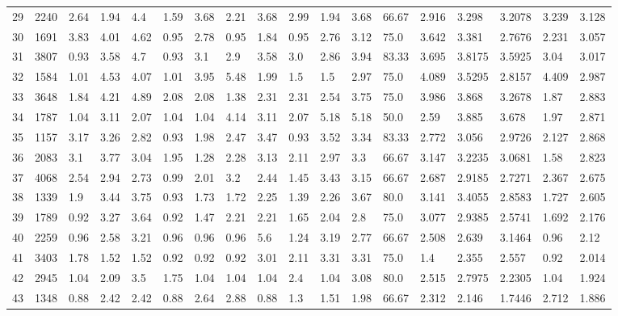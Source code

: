 \documentclass[landscape, 10pt]{report}
\begin{document}
\begin{longtable}{l || l || l | l | l | l | l | l | l | l | l | l | l || l | l | l | l | l}
\rowcolor{lightgray}29 & 2240 & 2.64 & 1.94 & 4.4 & 1.59 & 3.68 & 2.21 & 3.68 & 2.99 & 1.94 & 3.68 & 66.67 & 2.916 & 3.298 & 3.2078 & 3.239 & 3.128\\ 
30 & 1691 & 3.83 & 4.01 & 4.62 & 0.95 & 2.78 & 0.95 & 1.84 & 0.95 & 2.76 & 3.12 & 75.0 & 3.642 & 3.381 & 2.7676 & 2.231 & 3.057\\ 
\rowcolor{lightgray}31 & 3807 & 0.93 & 3.58 & 4.7 & 0.93 & 3.1 & 2.9 & 3.58 & 3.0 & 2.86 & 3.94 & 83.33 & 3.695 & 3.8175 & 3.5925 & 3.04 & 3.017\\ 
32 & 1584 & 1.01 & 4.53 & 4.07 & 1.01 & 3.95 & 5.48 & 1.99 & 1.5 & 1.5 & 2.97 & 75.0 & 4.089 & 3.5295 & 2.8157 & 4.409 & 2.987\\ 
\rowcolor{lightgray}33 & 3648 & 1.84 & 4.21 & 4.89 & 2.08 & 2.08 & 1.38 & 2.31 & 2.31 & 2.54 & 3.75 & 75.0 & 3.986 & 3.868 & 3.2678 & 1.87 & 2.883\\ 
34 & 1787 & 1.04 & 3.11 & 2.07 & 1.04 & 1.04 & 4.14 & 3.11 & 2.07 & 5.18 & 5.18 & 50.0 & 2.59 & 3.885 & 3.678 & 1.97 & 2.871\\ 
\rowcolor{lightgray}35 & 1157 & 3.17 & 3.26 & 2.82 & 0.93 & 1.98 & 2.47 & 3.47 & 0.93 & 3.52 & 3.34 & 83.33 & 2.772 & 3.056 & 2.9726 & 2.127 & 2.868\\ 
36 & 2083 & 3.1 & 3.77 & 3.04 & 1.95 & 1.28 & 2.28 & 3.13 & 2.11 & 2.97 & 3.3 & 66.67 & 3.147 & 3.2235 & 3.0681 & 1.58 & 2.823\\ 
\rowcolor{lightgray}37 & 4068 & 2.54 & 2.94 & 2.73 & 0.99 & 2.01 & 3.2 & 2.44 & 1.45 & 3.43 & 3.15 & 66.67 & 2.687 & 2.9185 & 2.7271 & 2.367 & 2.675\\ 
38 & 1339 & 1.9 & 3.44 & 3.75 & 0.93 & 1.73 & 1.72 & 2.25 & 1.39 & 2.26 & 3.67 & 80.0 & 3.141 & 3.4055 & 2.8583 & 1.727 & 2.605\\ 
\rowcolor{lightgray}39 & 1789 & 0.92 & 3.27 & 3.64 & 0.92 & 1.47 & 2.21 & 2.21 & 1.65 & 2.04 & 2.8 & 75.0 & 3.077 & 2.9385 & 2.5741 & 1.692 & 2.176\\ 
40 & 2259 & 0.96 & 2.58 & 3.21 & 0.96 & 0.96 & 0.96 & 5.6 & 1.24 & 3.19 & 2.77 & 66.67 & 2.508 & 2.639 & 3.1464 & 0.96 & 2.12\\ 
\rowcolor{lightgray}41 & 3403 & 1.78 & 1.52 & 1.52 & 0.92 & 0.92 & 0.92 & 3.01 & 2.11 & 3.31 & 3.31 & 75.0 & 1.4 & 2.355 & 2.557 & 0.92 & 2.014\\ 
42 & 2945 & 1.04 & 2.09 & 3.5 & 1.75 & 1.04 & 1.04 & 1.04 & 2.4 & 1.04 & 3.08 & 80.0 & 2.515 & 2.7975 & 2.2305 & 1.04 & 1.924\\ 
\rowcolor{lightgray}43 & 1348 & 0.88 & 2.42 & 2.42 & 0.88 & 2.64 & 2.88 & 0.88 & 1.3 & 1.51 & 1.98 & 66.67 & 2.312 & 2.146 & 1.7446 & 2.712 & 1.886\\ 

\end{longtable}
\end{document}
